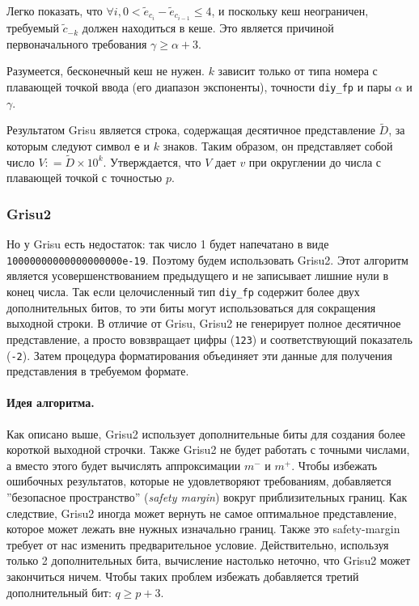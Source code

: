 \documentclass[a4paper, 12pt, twoside]{article}
\begin{document}
Легко показать, что $\forall i, 0 < \tilde{e}_{c_i} - \tilde{e}_{c_{i-1}} \leqslant 4$, и поскольку кеш неограничен, требуемый $\tilde{c}_{-k}$ должен находиться в кеше. 
Это является причиной первоначального требования $\gamma \geqslant \alpha + 3$.

Разумеется, бесконечный кеш не нужен. 
$k$ зависит только от типа номера с плавающей точкой ввода (его диапазон экспоненты), точности \texttt{diy\_fp} и пары $\alpha$ и $\gamma$.

Результатом \textsf{Grisu} является строка, содержащая десятичное представление $\tilde{D}$, за которым следуют символ \texttt{e} и $k$ знаков. 
Таким образом, он представляет собой число $V: = \tilde{D} \times 10^k$. 
Утверждается, что $V$ дает $v$ при округлении до числа с плавающей точкой с точностью $p$.

\subsubsection{\textsf{Grisu2}}
Но у \textsf{Grisu} есть недостаток: так число 1 будет напечатано в виде \\ \texttt{10000000000000000000e-19}.
Поэтому будем использовать \textsf{Grisu2}.
Этот алгоритм является усовершенствованием предыдущего и не записывает лишние нули в конец числа.
Так если целочисленный тип \texttt{diy\_fp} содержит более двух дополнительных битов, то эти биты могут использоваться для сокращения выходной строки.
В отличие от \textsf{Grisu}, \textsf{Grisu2} не генерирует полное десятичное представление, а просто вовзвращает цифры (\texttt{123}) и соответствующий показатель (\texttt{-2}). 
Затем процедура форматирования объединяет эти данные для получения представления в требуемом формате.

\paragraph{Идея алгоритма.} 
Как описано выше, \textsf{Grisu2} использует дополнительные биты для создания более короткой выходной строчки. 
Также \textsf{Grisu2} не будет работать с точными числами, а вместо этого будет вычислять аппроксимации $m^{-}$ и $m^+$. 
Чтобы избежать ошибочных результатов, которые не удовлетворяют требованиям, добавляется ''безопасное пространство'' (\textit{safety margin}) вокруг приблизительных границ. 
Как следствие, \textsf{Grisu2} иногда может вернуть не самое оптимальное представление, которое может лежать вне нужных изначально границ. 
Также это safety-margin требует от нас изменить предварительное условие. 
Действительно, используя только 2 дополнительных бита, вычисление настолько неточно, что \textsf{Grisu2} может закончиться ничем.
Чтобы таких проблем избежать добавляется третий дополнительный бит: $q \geqslant p + 3$.
\end{document}
